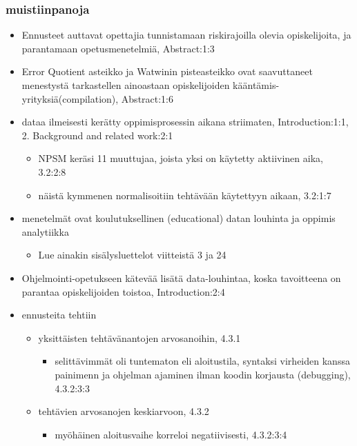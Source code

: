 \documentclass[finnish,twoside,openright]{HYgraduMLDS}
\begin{document}
\subsubsection{muistiinpanoja}

\begin{itemize}
    \item Ennusteet auttavat opettajia tunnistamaan riskirajoilla olevia opiskelijoita, ja parantamaan opetusmenetelmiä\cite{carter2015normalized}, Abstract:1:3
    \item Error Quotient asteikko\cite{jadud2006methods} ja Watwinin pisteasteikko\cite{watson2014no} ovat saavuttaneet menestystä tarkastellen ainoastaan opiskelijoiden kääntämis-yrityksiä(compilation), Abstract:1:6
    \item dataa ilmeisesti kerätty oppimisprosessin aikana striimaten\cite{carter2015normalized}, Introduction:1:1, 2. Background and related work:2:1
        \begin{itemize}
            \item NPSM keräsi 11 muuttujaa, joista yksi on käytetty aktiivinen aika, 3.2:2:8
            \item näistä kymmenen normalisoitiin tehtävään käytettyyn aikaan, 3.2:1:7
        \end{itemize}
    \item menetelmät ovat koulutuksellinen (educational) datan louhinta ja oppimis analytiikka
    \begin{itemize}
        \item Lue ainakin sisälysluettelot viitteistä 3 ja 24
    \end{itemize}
    \item Ohjelmointi-opetukseen kätevää lisätä data-louhintaa, koska tavoitteena on parantaa opiskelijoiden toistoa, Introduction:2:4
    \item ennusteita tehtiin
    \begin{itemize}
        \item yksittäisten tehtävänantojen arvosanoihin, 4.3.1
        \begin{itemize}
            \item selittävimmät oli tuntematon eli aloitustila, syntaksi virheiden kanssa painimenn ja ohjelman ajaminen ilman koodin korjausta (debugging), 4.3.2:3:3
        \end{itemize}
        \item tehtävien arvosanojen keskiarvoon, 4.3.2
        \begin{itemize}
            \item myöhäinen aloitusvaihe korreloi negatiivisesti, 4.3.2:3:4

\end{itemize}
\end{itemize}
\end{itemize}
\end{document}
